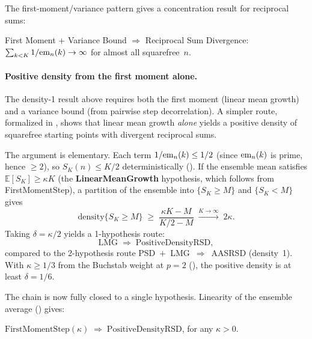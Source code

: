 The first-moment/variance pattern gives a concentration result for
reciprocal sums:

\begin{theorem}
First Moment + Variance Bound $\Longrightarrow$ Reciprocal Sum
Divergence: $\sum_{k < K} 1/\mathrm{em}_{n}(k) \to \infty$ for
almost all squarefree~$n$.
\end{theorem}

\paragraph{Positive density from the first moment alone.}
The density-1 result above requires both the first moment (linear
mean growth) and a variance bound (from pairwise step decorrelation).
A simpler route, formalized in
,
shows that linear mean growth \emph{alone} yields a positive density
of squarefree starting points with divergent reciprocal sums.

The argument is elementary.  Each term $1/\mathrm{em}_{n}(k) \leq 1/2$
(since $\mathrm{em}_{n}(k)$ is prime, hence $\geq 2$), so
$S_K(n) \leq K/2$ deterministically
().
If the ensemble mean satisfies $\mathbb{E}[S_K] \geq \kappa K$ (the
\textbf{LinearMeanGrowth} hypothesis, which follows from
FirstMomentStep), a partition of the ensemble into
$\{S_K \geq M\}$ and $\{S_K < M\}$ gives
\[
  \mathrm{density}\{S_K \geq M\}
  \;\geq\;
  \frac{\kappa K - M}{K/2 - M}
  \;\xrightarrow{K \to \infty}\;
  2\kappa.
\]
Taking $\delta = \kappa/2$ yields a 1-hypothesis route:
\[
  \mathrm{LMG}
  \;\Longrightarrow\;
  \text{PositiveDensityRSD},
\]
compared to the 2-hypothesis route
PSD~$+$~LMG~$\Rightarrow$~AASRSD (density~1).
With $\kappa \geq 1/3$ from the Buchstab weight at $p=2$
(),
the positive density is at least $\delta = 1/6$.

The chain is now fully closed to a single hypothesis.
Linearity of the ensemble average
()
gives:

\begin{theorem}
\label{thm:fms-pdrsd}
$\mathrm{FirstMomentStep}(\kappa) \;\Longrightarrow\;
\mathrm{PositiveDensityRSD}$, for any $\kappa > 0$.
\end{theorem}

